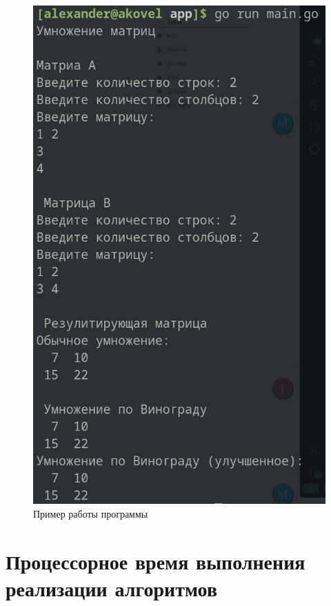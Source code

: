 \begin{figure}[ht!]
	\begin{center}
		\captionsetup{singlelinecheck = false, justification=centerfirst}
		\includegraphics[scale=0.8]{assets/demonstration.png}
		\caption{Пример работы программы}
		\label{demonstration}
	\end{center}
	
	
\end{figure}

\newpage

\section{Процессорное время выполнения реализации алгоритмов}

